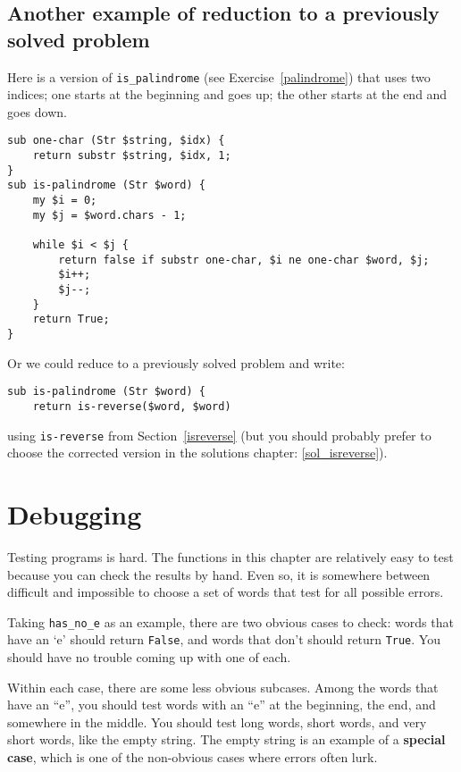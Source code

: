 \subsection{Another example of reduction to a previously solved problem}

\label{palindrome_2}
Here is a version of \verb"is_palindrome" (see
Exercise~\ref{palindrome}) that uses two indices; one starts at the
beginning and goes up; the other starts at the end and goes down.

\begin{verbatim}
sub one-char (Str $string, $idx) {
    return substr $string, $idx, 1;
}
sub is-palindrome (Str $word) {
    my $i = 0;
    my $j = $word.chars - 1;

    while $i < $j {
        return false if substr one-char, $i ne one-char $word, $j;
        $i++;
        $j--;
    }
    return True;
}
\end{verbatim}

Or we could reduce to a previously solved
problem and write:

\begin{verbatim}
sub is-palindrome (Str $word) {
    return is-reverse($word, $word)
\end{verbatim}
%
using \verb"is-reverse" from Section~\ref{isreverse} (but
you should probably prefer to choose the corrected version 
in the solutions chapter: \ref{sol_isreverse}).


\section{Debugging}

Testing programs is hard.  The functions in this chapter are
relatively easy to test because you can check the results by hand.
Even so, it is somewhere between difficult and impossible to choose a
set of words that test for all possible errors.

Taking \verb"has_no_e" as an example, there are two obvious
cases to check: words that have an `e' should return {\tt False}, and
words that don't should return {\tt True}.  You should have no
trouble coming up with one of each.

Within each case, there are some less obvious subcases.  Among the
words that have an ``e'', you should test words with an ``e'' at the
beginning, the end, and somewhere in the middle.  You should test long
words, short words, and very short words, like the empty string.  The
empty string is an example of a {\bf special case}, which is one of
the non-obvious cases where errors often lurk.

